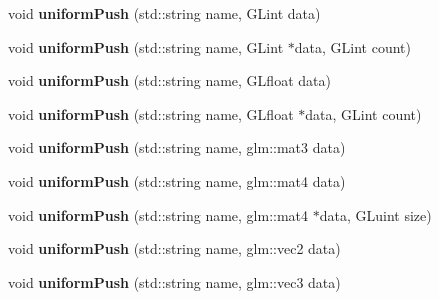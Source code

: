 \begin{DoxyCompactItemize}
\item 
void {\bfseries uniform\+Push} (std\+::string name, G\+Lint data)\hypertarget{classflw_1_1flc_1_1Program_a9ca0ca0e8c29955c8fe1a556bc36fce1}{}\label{classflw_1_1flc_1_1Program_a9ca0ca0e8c29955c8fe1a556bc36fce1}

\item 
void {\bfseries uniform\+Push} (std\+::string name, G\+Lint $\ast$data, G\+Lint count)\hypertarget{classflw_1_1flc_1_1Program_a3b2605cb8296214b02710d6df436ddf4}{}\label{classflw_1_1flc_1_1Program_a3b2605cb8296214b02710d6df436ddf4}

\item 
void {\bfseries uniform\+Push} (std\+::string name, G\+Lfloat data)\hypertarget{classflw_1_1flc_1_1Program_aaa662a66594f353b769f664cd61809b9}{}\label{classflw_1_1flc_1_1Program_aaa662a66594f353b769f664cd61809b9}

\item 
void {\bfseries uniform\+Push} (std\+::string name, G\+Lfloat $\ast$data, G\+Lint count)\hypertarget{classflw_1_1flc_1_1Program_ab4b532c34a56e55fb65b43ffd8aad629}{}\label{classflw_1_1flc_1_1Program_ab4b532c34a56e55fb65b43ffd8aad629}

\item 
void {\bfseries uniform\+Push} (std\+::string name, glm\+::mat3 data)\hypertarget{classflw_1_1flc_1_1Program_ab5cea8fdc3dccf65ba239af5d77e6973}{}\label{classflw_1_1flc_1_1Program_ab5cea8fdc3dccf65ba239af5d77e6973}

\item 
void {\bfseries uniform\+Push} (std\+::string name, glm\+::mat4 data)\hypertarget{classflw_1_1flc_1_1Program_a6ef7793f8007f68a69294f9742e715b8}{}\label{classflw_1_1flc_1_1Program_a6ef7793f8007f68a69294f9742e715b8}

\item 
void {\bfseries uniform\+Push} (std\+::string name, glm\+::mat4 $\ast$data, G\+Luint size)\hypertarget{classflw_1_1flc_1_1Program_a54050b6a3c1fb61c123600ab02a28e66}{}\label{classflw_1_1flc_1_1Program_a54050b6a3c1fb61c123600ab02a28e66}

\item 
void {\bfseries uniform\+Push} (std\+::string name, glm\+::vec2 data)\hypertarget{classflw_1_1flc_1_1Program_a82310ff1a7e7eb6950a053eee51d4335}{}\label{classflw_1_1flc_1_1Program_a82310ff1a7e7eb6950a053eee51d4335}

\item 
void {\bfseries uniform\+Push} (std\+::string name, glm\+::vec3 data)\hypertarget{classflw_1_1flc_1_1Program_a7e659f2f9d6dc6f07f4c117543ebaced}{}\label{classflw_1_1flc_1_1Program_a7e659f2f9d6dc6f07f4c117543ebaced}


\end{DoxyCompactItemize}
